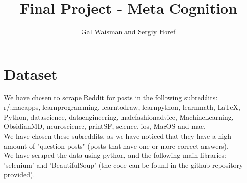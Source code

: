\documentclass[11pt, oneside]{article}   	%
\title{Final Project - Meta Cognition}
\author{Gal Waisman and Sergiy Horef}
\begin{document}
\maketitle
\section{Dataset}
We have chosen to scrape Reddit for posts in the following subreddits:\\
r/:macapps, learnprogramming, learntodraw, learnpython, learnmath, LaTeX, Python, datascience, dataengineering, malefashionadvice, MachineLearning, ObsidianMD, neuroscience, printSF, science, ios, MacOS and mac.\\
We have chosen these subreddits, as we have noticed that they have a high amount of "question posts" (posts that have one or more correct answers).\\

We have scraped the data using python, and the following main libraries: 'selenium' and 'BeautifulSoup' (the code can be found in the github repository provided).
\end{document}
